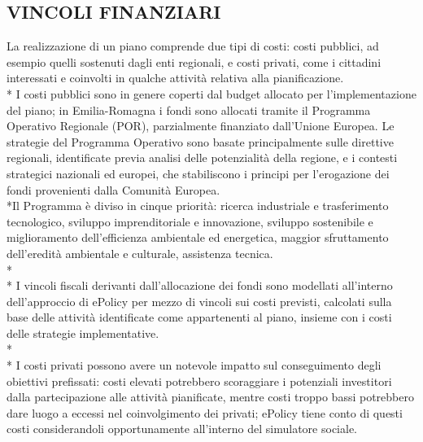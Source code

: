 \documentclass[12pt,a4paper,openright,twoside]{report}
\begin{document}
\subsection[VINCOLI FINANZIARI]{\nohyphens{VINCOLI FINANZIARI}}
La realizzazione di un piano comprende due tipi di costi: costi pubblici, ad esempio quelli sostenuti dagli enti regionali, e costi privati, come i cittadini interessati e coinvolti in qualche attività relativa alla pianificazione.\\*
I costi pubblici sono in genere coperti dal budget allocato per l'implementazione del piano;  in Emilia-Romagna i fondi sono allocati tramite il Programma Operativo Regionale \cite{POR} (POR), parzialmente finanziato dall'Unione Europea. Le strategie del Programma Operativo sono basate principalmente sulle direttive regionali, identificate previa analisi delle potenzialità della regione, e i contesti strategici nazionali ed europei, che stabiliscono i principi per l'erogazione dei fondi provenienti dalla Comunità Europea.\\*Il Programma è diviso in cinque priorità: ricerca industriale e trasferimento tecnologico, sviluppo imprenditoriale e innovazione, sviluppo sostenibile e miglioramento dell'efficienza ambientale ed energetica, maggior sfruttamento dell'eredità ambientale e culturale, assistenza tecnica.\\*\\*
I vincoli fiscali derivanti dall'allocazione dei fondi sono modellati all'interno dell'approccio di ePolicy per mezzo di vincoli sui costi previsti, calcolati sulla base delle attività identificate come appartenenti al piano, insieme con i costi delle strategie implementative. \\*\\*
I costi privati possono avere un notevole impatto sul conseguimento degli obiettivi prefissati: costi elevati potrebbero scoraggiare i potenziali investitori dalla partecipazione alle attività pianificate, mentre costi troppo bassi potrebbero dare luogo a eccessi nel coinvolgimento dei privati; ePolicy tiene conto di questi costi considerandoli opportunamente all'interno del simulatore sociale.
 
\end{document}
